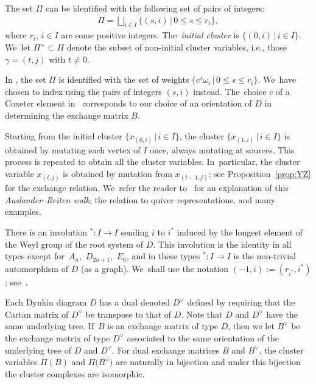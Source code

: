 \documentclass[10pt,a4paper]{amsart}
\numberwithin{equation}{section}
\begin{document}
The set $\Pi$ can be identified with the following set of pairs of integers:
\begin{gather}\label{eq:Pidef}
\Pi = \bigsqcup_{i \in I} \{(s,i) \,|\, 0 \leq s \leq r_i\},
\end{gather}
where $r_i$, $i \in I$ are some positive integers. The~\emph{initial cluster} is $\{(0,i) \,|\, i \in I\}$. We~let $\Pi^+ \subset \Pi$ denote the subset of non-initial cluster variables, i.e., those $\gamma = (t,j)$ with $t \neq 0$.

\begin{Remark}
In \cite{YZ}, the set $\Pi$ is identified with the set of weights $\{c^s \omega_i \,|\, 0 \leq s \leq r_i\}$. We~have chosen to index using the pairs of integers $(s,i)$ instead. The~choice $c$ of a Coxeter element in~\cite{YZ} corresponds to our choice of an orientation of $D$ in determining the exchange matrix $B$.
\end{Remark}

\begin{Remark}
Starting from the initial cluster $\{x_{(0,i)} \,|\, i \in I\}$, the cluster $\{x_{(1,i)} \,|\, i \in I\}$ is obtained by mutating each vertex of $I$ once, always mutating at sources. This process is repeated to obtain all the cluster variables. In~particular, the cluster variable $x_{(t,j)}$ is obtained by mutation from $x_{(t-1,j)}$; see Proposition~\ref{prop:YZ} for the exchange relation. We~refer the reader to~\cite{BDMTY} for an explanation of this \emph{Auslander--Reiten walk}, the relation to quiver representations, and many examples.
\end{Remark}

\bigskip{}
There is an involution ${}^*\colon I \to I$ sending $i$ to $i^*$ induced by the longest element of the Weyl group of the root system of $D$. This involution is the identity in all types except for~$A_n$,~$D_{2n+1}$,~$E_6$, and in these types ${}^*\colon I \to I$ is the non-trivial automorphism of $D$ (as a graph). We~shall use the notation $(-1,i):= (r_{i^*}, i^*)$; see~\cite[Proposition~1.3]{YZ}.

\bigskip{} %
Each Dynkin diagram $D$ has a dual denoted $D^\vee$ defined by requiring that the Cartan matrix of $D^\vee$ be transpose to that of $D$. Note that $D$ and $D^\vee$ have the same underlying tree. If~$B$ is an exchange matrix of type $D$, then we let $B^\vee$ be the exchange matrix of type $D^\vee$ associated to the same orientation of the underlying tree of $D$ and $D^\vee$.
For dual exchange matrices $B$ and $B^\vee$, the cluster variables $\Pi(B)$ and $\Pi\big(B^\vee\big)$ are naturally in bijection and under this bijection the cluster complexes are isomorphic.
\end{document}
